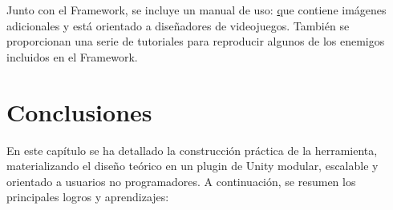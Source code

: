 Junto con el Framework, se incluye un manual de uso: \href{https://github.com/CristinaMora/EnemyBehaviourFramework-2D/tree/c1faf3195c68eb55e0c9239c02ca077aac270f7c} que contiene imágenes adicionales y está orientado a diseñadores de videojuegos. También se proporcionan una serie de tutoriales para reproducir algunos de los enemigos incluidos en el Framework.


\section{Conclusiones}

En este capítulo se ha detallado la construcción práctica de la herramienta, materializando el diseño teórico en un plugin de Unity modular, escalable y orientado a usuarios no programadores. A continuación, se resumen los principales logros y aprendizajes:

